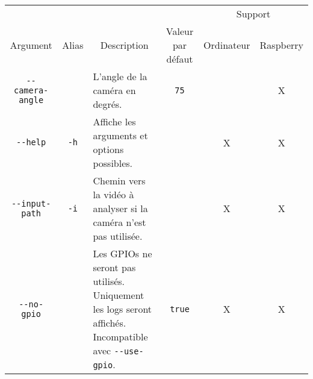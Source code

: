 \begin{table}[H]
    \centering
    \begin{tabularx}{\linewidth}{|c|c|X|c|c|c|}
        \hline
        \cellcolor{tableColorDark}                           & \cellcolor{tableColorDark}                        & \multicolumn{1}{c|}{\cellcolor{tableColorDark}}                                                                 & \cellcolor{tableColorDark}                                    & \multicolumn{2}{c|}{\cellcolor{tableColorDark}Support}                                          \\ \cline{5-6}
        \multirow{-2}{*}{\cellcolor{tableColorDark}Argument} & \multirow{-2}{*}{\cellcolor{tableColorDark}Alias} & \multicolumn{1}{c|}{\multirow{-2}{*}{\cellcolor{tableColorDark}Description}}                                    & \multirow{-2}{*}{\cellcolor{tableColorDark}Valeur par défaut} & \multicolumn{1}{c|}{\cellcolor{tableColorDark}Ordinateur} & \cellcolor{tableColorDark}Raspberry \\ \hline
        \texttt{-{}-camera-angle}                            &                                                   & L'angle de la caméra en degrés.                                                                                 & \texttt{75}                                                   &                                                           & X                                   \\\hline
        \texttt{-{}-help}                                    & \texttt{-h}                                       & Affiche les arguments et options possibles.                                                                     &                                                               & X                                                         & X                                   \\\hline
        \texttt{-{}-input-path}                              & \texttt{-i}                                       & Chemin vers la vidéo à analyser si la caméra n'est pas utilisée.                                                &                                                               & X                                                         & X                                   \\\hline
        \texttt{-{}-no-gpio}                                 &                                                   & Les GPIOs ne seront pas utilisés. Uniquement les logs seront affichés. Incompatible avec \texttt{-{}-use-gpio}. & \texttt{true}                                                 & X                                                         & X                                   \\\hline

\end{tabularx}
\end{table}
